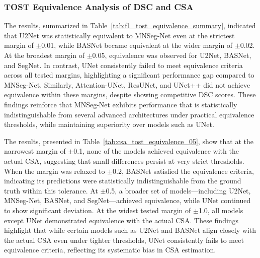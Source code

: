 {\subsubsection{TOST Equivalence Analysis of DSC and CSA}}

\noindent
The results, summarized in Table~\ref{tab:f1_tost_equivalence_summary}, indicated that U2Net was statistically equivalent to MNSeg-Net even at the strictest margin of $\pm$0.01, while BASNet became equivalent at the wider margin of $\pm$0.02. At the broadest margin of $\pm$0.05, equivalence was observed for U2Net, BASNet, and SegNet. In contrast, UNet consistently failed to meet equivalence criteria across all tested margins, highlighting a significant performance gap compared to MNSeg-Net. Similarly, Attention-UNet, ResUNet, and UNet++ did not achieve equivalence within these margins, despite showing competitive DSC scores. These findings reinforce that MNSeg-Net exhibits performance that is statistically indistinguishable from several advanced architectures under practical equivalence thresholds, while maintaining superiority over models such as UNet.

\noindent
The results, presented in Table~\ref{tab:csa_tost_equivalence_05}, show that at the narrowest margin of $\pm$0.1, none of the models achieved equivalence with the actual CSA, suggesting that small differences persist at very strict thresholds. When the margin was relaxed to $\pm$0.2, BASNet satisfied the equivalence criteria, indicating its predictions were statistically indistinguishable from the ground truth within this tolerance. At $\pm$0.5, a broader set of models—including U2Net, MNSeg-Net, BASNet, and SegNet—achieved equivalence, while UNet continued to show significant deviation. At the widest tested margin of $\pm$1.0, all models except UNet demonstrated equivalence with the actual CSA. These findings highlight that while certain models such as U2Net and BASNet align closely with the actual CSA even under tighter thresholds, UNet consistently fails to meet equivalence criteria, reflecting its systematic bias in CSA estimation.




